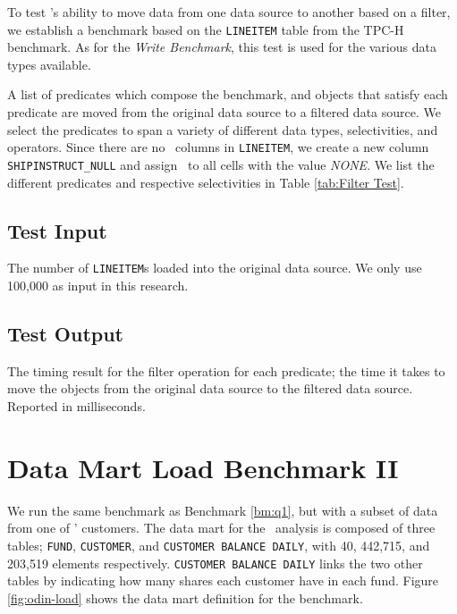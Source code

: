 To test \gap's ability to move data from one data source to another based on a filter, we establish a benchmark based on the \texttt{LINEITEM} table from the TPC-H benchmark. As for the \textit{Write Benchmark}, this test is used for the various data types available.

A list of predicates which compose the benchmark, and objects that satisfy each predicate are moved from the original data source to a filtered data source. We select the predicates to span a variety of different data types, selectivities, and operators. Since there are no \null~columns in \texttt{LINEITEM}, we create a new column \texttt{SHIPINSTRUCT\_NULL} and assign \null~to all cells with the value \textit{NONE}. We list the different predicates and respective selectivities in Table \ref{tab:Filter Test}.

\subsection{Test Input}
\label{sub:Test Input}
The number of \texttt{LINEITEM}s loaded into the original data source. We only use 100,000 as input in this research.

\subsection{Test Output}
\label{sub:Test Output}
The timing result for the filter operation for each predicate; the time it takes to move the objects from the original data source to the filtered data source. Reported in milliseconds.

\section{Data Mart Load Benchmark II}
\label{bm:odin-load}


We run the same benchmark as Benchmark \ref{bm:q1}, but with a subset of data from one of \genus' customers. The data mart for the \gd~analysis is composed of three tables; \texttt{FUND}, \texttt{CUSTOMER}, and \texttt{CUSTOMER BALANCE DAILY}, with 40, 442,715, and 203,519 elements respectively. \texttt{CUSTOMER BALANCE DAILY} links the two other tables by indicating how many shares each customer have in each fund. Figure \ref{fig:odin-load} shows the data mart definition for the benchmark.

